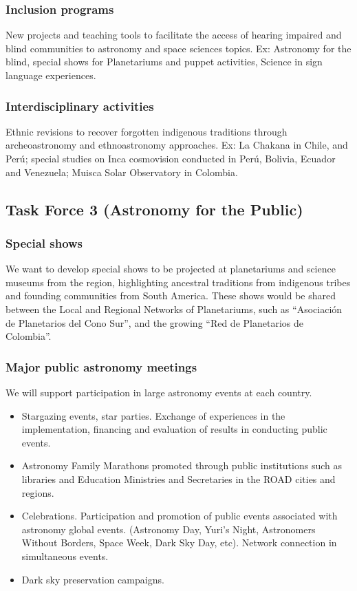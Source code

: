 \documentclass[12pt]{article}
\begin{document}
\subsubsection*{Inclusion programs}
New projects and teaching tools to facilitate the access of hearing
impaired and blind communities to astronomy and space sciences
topics. Ex: Astronomy for the blind, special shows for Planetariums
and puppet activities, Science in sign language experiences.   

\subsubsection*{Interdisciplinary activities}
Ethnic revisions to recover forgotten indigenous traditions through
archeoastronomy and ethnoastronomy approaches. Ex: La Chakana in
Chile, and Perú; special studies on Inca cosmovision conducted in
Perú, Bolivia, Ecuador and Venezuela; Muisca Solar Observatory in
Colombia.  

\subsection{Task Force 3 (Astronomy for the Public)}


\subsubsection*{Special shows} 

We want to develop special shows to be projected at planetariums and
science museums from the region, highlighting ancestral traditions
from indigenous tribes and founding communities from South
America. These shows would be shared between the Local and Regional
Networks of Planetariums, such as “Asociación de Planetarios del Cono
Sur”, and the growing “Red de Planetarios de Colombia”.  

\subsubsection*{Major public astronomy meetings} 

We will support participation in large astronomy events at each
country. 

\begin{itemize}
\item Stargazing events, star parties. Exchange of experiences in
the implementation, financing and evaluation of results in conducting
public events. 
\item Astronomy Family Marathons promoted through public institutions
  such as libraries and Education Ministries and Secretaries in the
  ROAD cities and regions. 

\item Celebrations. Participation and promotion of public events
  associated with astronomy global events. (Astronomy Day, Yuri's
  Night, Astronomers Without Borders, Space Week, Dark Sky Day,
  etc). Network connection in simultaneous events.  
\item Dark sky preservation campaigns.
\end{itemize}
\end{document}

